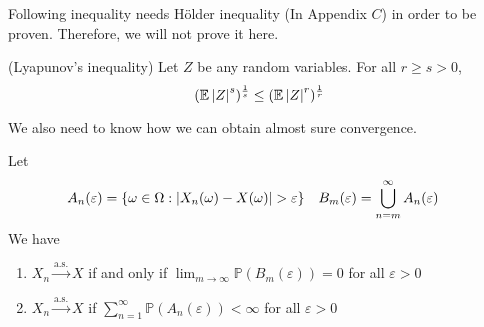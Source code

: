 \documentclass{huhtakm-template-book}
\newcommand{\prob}{\mathbb{P}}
\newcommand{\expect}{\mathbb{E}}
\begin{document}
Following inequality needs H\"older inequality (In Appendix $C$) in order to be proven. Therefore, we will not prove it here.
\begin{lem}(Lyapunov's inequality)
	Let $Z$ be any random variables. For all $r\geq s>0$,
	\begin{equation*}
		(\expect\abs{Z}^{s})^{\frac{1}{s}}\leq(\expect\abs{Z}^{r})^{\frac{1}{r}}
	\end{equation*}
\end{lem}
We also need to know how we can obtain almost sure convergence.
\begin{lem}
	\label{Chapter 8 (Lemma) Obtaining almost sure convergence}
	Let
	\begin{align*}
		A_{n}(\varepsilon)&=\{\omega\in\Omega:\abs{X_{n}(\omega)-X(\omega)}>\varepsilon\} & B_{m}(\varepsilon)&=\bigcup_{n=m}^{\infty}A_{n}(\varepsilon)
	\end{align*}
	We have
	\begin{enumerate}
		\item $X_{n}\xrightarrow{\text{a.s.}}X$ if and only if $\lim_{m\to\infty}\prob(B_{m}(\varepsilon))=0$ for all $\varepsilon>0$
		\item $X_{n}\xrightarrow{\text{a.s.}}X$ if $\sum_{n=1}^{\infty}\prob(A_{n}(\varepsilon))<\infty$ for all $\varepsilon>0$
	\end{enumerate}
\end{lem}
\end{document}
